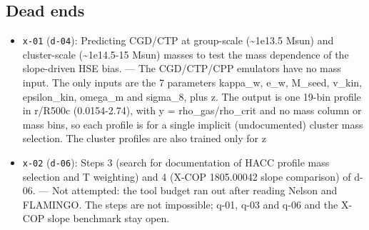 \documentclass[11pt,a4paper]{article}
\begin{document}
\subsection{Dead ends}
\begin{itemize}
  \item \texttt{x-01} (\texttt{d-04}): Predicting CGD/CTP at group-scale (\textasciitilde{}1e13.5 Msun) and cluster-scale (\textasciitilde{}1e14.5-15 Msun) masses to test the mass dependence of the slope-driven HSE bias. --- The CGD/CTP/CPP emulators have no mass input. The only inputs are the 7 parameters kappa\_w, e\_w, M\_seed, v\_kin, epsilon\_kin, omega\_m and sigma\_8, plus z. The output is one 19-bin profile in r/R500c (0.0154-2.74), with y = rho\_gas/rho\_crit and no mass column or mass bins, so each profile is for a single implicit (undocumented) cluster mass selection. The cluster profiles are also trained only for z
  \item \texttt{x-02} (\texttt{d-06}): Steps 3 (search for documentation of HACC profile mass selection and T weighting) and 4 (X-COP 1805.00042 slope comparison) of d-06. --- Not attempted: the tool budget ran out after reading Nelson and FLAMINGO. The steps are not impossible; q-01, q-03 and q-06 and the X-COP slope benchmark stay open.
\end{itemize}
\end{document}
